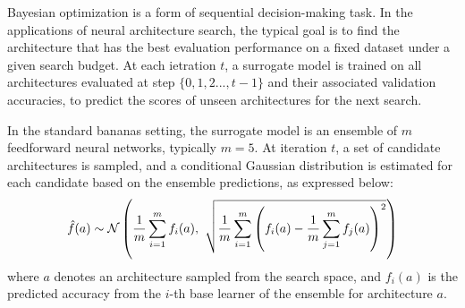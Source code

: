 {{\begin{algorithm}[htbp]
\begin{algorithmic}[1]
{\begin{enumerate}
{			\item Denote $a_{t}$ as the candidate architecture with maximum $\myfunc{\phi(a)}$; evaluate $\myfunc{f(a_{t})}$.
			\item $\mathcal{A}_{t} \leftarrow{\mathcal{A}_{t-1} \cup \{{a_{t}\}}$
		\end{enumerate}
    \ENDFOR 
    \STATE \textbf{Output:} $a^{*}=\operatorname*{argmax}_{t=1,...,T} f(a_{t})$    
  \end{algorithmic}
  \end{algorithm}

Bayesian optimization is a form of sequential decision-making task. In the applications of neural architecture search, the typical goal is to find the architecture that has the best evaluation performance on a fixed dataset under a given search budget. At each ietration $t$, a surrogate model is trained on all architectures evaluated at step $\{0, 1, 2..., t-1\}$ and their associated validation accuracies, to predict the scores of unseen architectures for the next search.

In the standard \gls{bananas} setting, the surrogate model is an ensemble of $m$ feedforward neural networks, typically $m=5$. At iteration $t$, a set of candidate architectures is sampled, and a conditional Gaussian distribution is estimated for each candidate based on the ensemble predictions, as expressed below:
\vspace{1em}
\begin{equation}
\hat{f}(a) \sim \mathcal{N} \left( 
\frac{1}{m} \sum_{i=1}^{m} f_i(a),\ 
\sqrt{\frac{1}{m} \sum_{i=1}^{m} \left(f_i(a) - \frac{1}{m} \sum_{j=1}^{m} f_j(a) \right)^2}
\right)
\label{eq:ensemble_gaussian}
\vspace{0.7em}
\end{equation}
\noindent
where $a$ denotes an architecture sampled from the search space, and $f_i(a)$ is the predicted accuracy from the $i$-th base learner of the ensemble for architecture $a$.

}}
